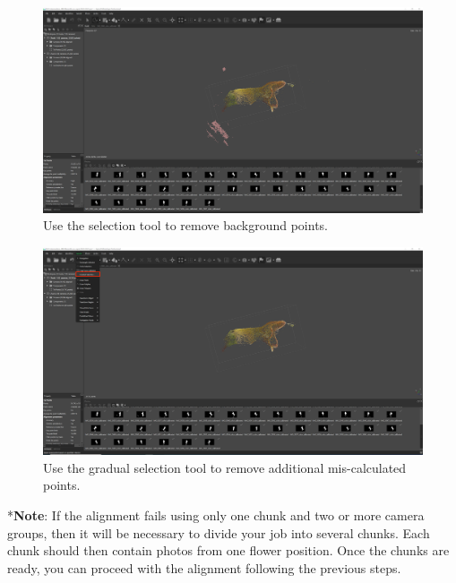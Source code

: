 \documentclass[
]{book}
\begin{document}
\begin{figure}

{\centering \includegraphics[width=1\linewidth]{Figures/metashape_delete_selectedpoints} 

}

\caption{Use the selection tool to remove background points.}\label{fig:removepoints1}
\end{figure}

\begin{figure}

{\centering \includegraphics[width=1\linewidth]{Figures/metashape_gradual_selection} 

}

\caption{Use the gradual selection tool to remove additional mis-calculated points.}\label{fig:removepoints2}
\end{figure}

*\textbf{Note}: If the alignment fails using only one chunk and two or more
camera groups, then it will be necessary to divide your job into several
chunks. Each chunk should then contain photos from one flower position.
Once the chunks are ready, you can proceed with the alignment following
the previous steps.
\end{document}
